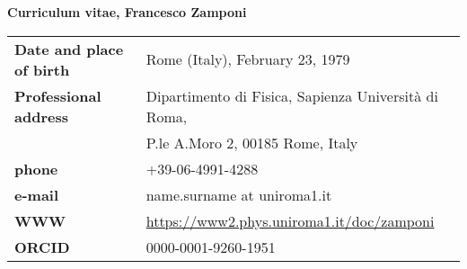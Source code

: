 \documentclass[a4paper,10pt]{article}
\begin{document}

\centerline{\LARGE \bf Curriculum vitae, Francesco Zamponi}

\noindent
\begin{table}[h]
\begin{tabular}{ll}
{\bf Date and place of birth}  & Rome (Italy), February 23, 1979 \\
{\bf Professional address} & Dipartimento di Fisica, Sapienza Universit\`a di Roma, \\
& P.le A.Moro 2, 00185 Rome, Italy \\
{\bf phone} & +39-06-4991-4288 \\
{\bf e-mail} & name.surname at uniroma1.it \\
{\bf WWW} & \href{https://www2.phys.uniroma1.it/doc/zamponi}{{\color{blue} https://www2.phys.uniroma1.it/doc/zamponi}} \\
{\bf ORCID} & 0000-0001-9260-1951 \\ 
\end{tabular}
\end{table}
\end{document}
